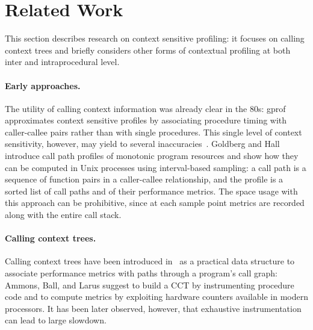 \documentclass[preprint]{sigplanconf}
\begin{document}



\section{Related Work}
\label{se:related}

This section describes research on context sensitive profiling: it focuses on calling context trees and briefly considers other forms of contextual profiling at both inter and intraprocedural level.

\paragraph{Early approaches.} The utility of calling context information was already clear in the 80s: gprof~\cite{GKM82} approximates context sensitive profiles by associating procedure timing with caller-callee pairs rather than with single procedures. This single level of context sensitivity, however, may yield to several inaccuracies~\cite{PF88, S04}. Goldberg and Hall~\cite{HG93}  introduce call path profiles of monotonic program resources and show how they can be computed in Unix processes using interval-based sampling: a call path is a sequence of function pairs in a caller-callee relationship, and the profile is a sorted list of call paths and of their performance metrics. The space usage with this approach can be prohibitive, since at each sample point metrics are recorded along with the entire call stack.

\vspace{-1mm}
\paragraph{Calling context trees.} Calling context trees have been introduced in~\cite{ABL97} as a practical data structure to associate performance metrics with paths through a program's call graph: Ammons, Ball, and Larus suggest to build a CCT by instrumenting procedure code and to compute metrics by exploiting hardware counters available in modern processors. It has been later observed, however, that exhaustive instrumentation can lead to large slowdown. 
\end{document}

